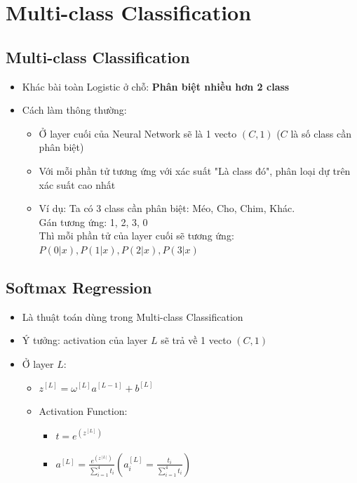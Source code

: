 \documentclass[12pt,a4paper]{report}
\begin{document}
	\section{Multi-class Classification}
			\subsection{Multi-class Classification} 
				\begin{itemize}
					\item Khác bài toàn Logistic ở chỗ: \textbf{Phân biệt nhiều hơn 2 class}
					\item Cách làm thông thường:
						\begin{itemize}
							\item Ở layer cuối của Neural Network sẽ là 1 vecto $ (C, 1) $ ($ C $ là số class cần phân biệt)
							\item Với mỗi phần tử tương ứng với xác suất "Là class đó", phân loại dự trên xác suất cao nhất
							\item Ví dụ: Ta có 3 class cần phân biệt: Méo, Cho, Chim, Khác.\\
								Gán tương ứng: 1, 2, 3, 0\\
								Thì mỗi phần tử của layer cuối sẽ tương ứng: $ P(0|x), P(1|x), P(2|x), P(3|x) $
						\end{itemize}
				\end{itemize}
			\subsection{Softmax Regression} 
				\begin{itemize}
					\item Là thuật toán dùng trong Multi-class Classification
					\item Ý tưởng: activation của layer $ L $ sẽ trả về 1 vecto $ (C, 1) $
					\item Ở layer $ L $:
						\begin{itemize}
							\item $ z^{[L]} = \omega^{[L]} a^{[L-1]} + b^{[L]} $
							\item Activation Function:
								\begin{itemize}
									\item $ t = e^{(z^{[L]})} $
									\item $ a^{[L]} = \frac{e^{(z^{[L]})}}{\sum_{i=1}^4 t_i}( a^{[L]}_i = \frac{t_i}{\sum_{i=1}^4 t_i} )$
								\end{itemize}
						\end{itemize}
				\end{itemize}
\end{document}
